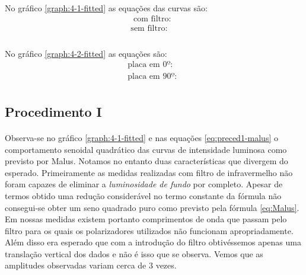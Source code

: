 \documentclass[a4paper,11pt]{article}
\begin{document}
\paragraph{} No gráfico \ref{graph:4-1-fitted} as equações das curvas são:
\begin{equation}
	\begin{array}{cc}
		\mbox{ com filtro:} &  \\
		\mbox{sem filtro:} &  \\		
	\end{array}
	\label{eq:preced1-malus}
\end{equation}

\paragraph{} No gráfico \ref{graph:4-2-fitted} as equações são:
\begin{equation}
	\begin{array}{cc}
		\mbox{ placa em 0º:} &  \\
		\mbox{ placa em 90º:} &  \\		
	\end{array}
	\label{eq:preced2-polarizacao-circ}
\end{equation}
\newpage

\subsection*{Procedimento I}
\paragraph{}Observa-se no gráfico \ref{graph:4-1-fitted} e nas equações \ref{eq:preced1-malus} o comportamento senoidal quadrático das curvas de intensidade luminosa como previsto por Malus. Notamos no entanto duas características que divergem do esperado. Primeiramente as medidas realizadas com filtro de infravermelho não foram capazes de eliminar a \emph{luminosidade de fundo} por completo. Apesar de termos obtido uma redução considerável no termo constante da fórmula não consegui-se obter um seno quadrado puro como previsto pela fórmula \ref{eq:Malus}. Em nossas medidas existem portanto comprimentos de onda que passam pelo filtro para os quais os polarizadores utilizados não funcionam apropriadamente. Além disso era esperado que com a introdução do filtro obtivéssemos apenas uma translação vertical dos dados e não é isso que se observa. Vemos que as amplitudes observadas variam cerca de 3 vezes.
\end{document}
